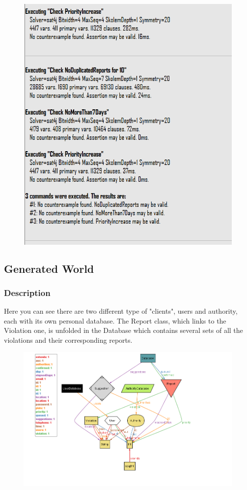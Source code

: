 \documentclass[12pt,a4paper]{article}
\begin{document}
			\begin{figure}[H]
				\centering
				\includegraphics[width=1.2\linewidth]{../assets/images/exports/user/Checks.png}
				\label{fig:check}
			\end{figure}
\subsection{Generated World}
\subsubsection{Description}
Here you can see there are two different type of "clients", users and authority, each with its own personal database.\newline
The Report class, which links to the Violation one, is unfolded in the Database which contains several sets of all the violations and their corresponding reports.
\begin{figure}[H]
				\centering
				\includegraphics[width=1.5\linewidth]{../assets/images/exports/user/GeneratedWorld.png}
				\label{fig:GenWorld}
			\end{figure}
\newpage
\end{document}
